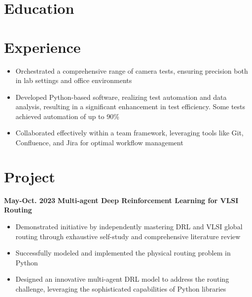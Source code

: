 \documentclass[11pt,a4paper,sans]{moderncv}
\begin{document}
\makecvtitle

\section{Education}

\section{Experience}
{
    \begin{itemize}
    \item Orchestrated a comprehensive range of camera tests, ensuring precision both in lab settings and office environments
    \item Developed Python-based software, realizing test automation and data analysis, resulting in a significant enhancement in test efficiency. Some tests achieved automation of up to 90\%
    \item Collaborated effectively within a team framework, leveraging tools like Git, Confluence,  and Jira for optimal workflow management 
    \end{itemize}
}

\section{Project}

\cventry
{\textnormal{\textbf{May-Oct. 2023}}}
{\textnormal{\textbf{Multi-agent Deep Reinforcement Learning for VLSI Routing}}}
{}{}{}
{
    \begin{itemize}
    \item Demonstrated initiative by independently mastering DRL and VLSI global routing through exhaustive self-study and comprehensive literature review
    \item Successfully modeled and implemented the physical routing problem in Python
    \item Designed an innovative multi-agent DRL model to address the routing challenge, leveraging the sophisticated capabilities of Python libraries
\end{itemize}
}
\end{document}
